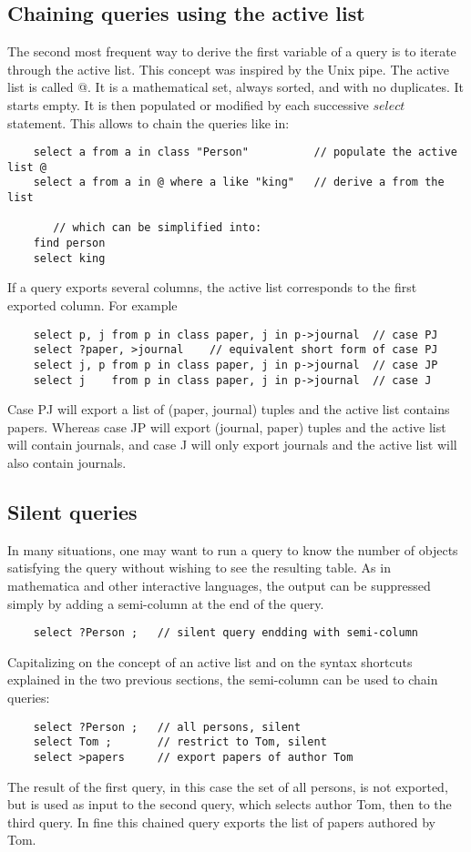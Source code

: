 \documentclass[11pt]{article}
\newcommand{\BL}{\begin{lstlisting}}
\begin{document}
\subsection{Chaining queries using the active list}
The second most frequent way to derive the first variable of a query is to iterate 
through the active list. This concept was inspired by the Unix pipe. 
The active list is called @. It is a mathematical set, always sorted,
and with no duplicates. It starts empty. It is then populated 
or modified by each successive $select$ statement. This allows to chain the queries like in:
\BL
    select a from a in class "Person"          // populate the active list @
    select a from a in @ where a like "king"   // derive a from the list

       // which can be simplified into:
    find person
    select king
\end{lstlisting}

If a query exports several columns, the active list corresponds to the first exported column. For example
\BL
    select p, j from p in class paper, j in p->journal  // case PJ
    select ?paper, >journal    // equivalent short form of case PJ
    select j, p from p in class paper, j in p->journal  // case JP
    select j    from p in class paper, j in p->journal  // case J
\end{lstlisting}
Case PJ will export a list of (paper, journal) tuples and the active list contains 
papers. Whereas case JP will export (journal, paper) tuples and the active list 
will contain journals, and case J will only export journals  and the active list will also contain journals.


\subsection{Silent queries}

In many situations, one may want to run a query to know the number 
of objects satisfying the query without wishing to
see the resulting table. As in mathematica and other interactive
languages, the output can be suppressed simply by adding 
a semi-column at the end of the query.
\BL
    select ?Person ;   // silent query endding with semi-column
\end{lstlisting}

Capitalizing on the concept of an active list
and on the syntax shortcuts explained in the two previous sections,
the semi-column can be used to chain queries:
\BL
    select ?Person ;   // all persons, silent
    select Tom ;       // restrict to Tom, silent
    select >papers     // export papers of author Tom
\end{lstlisting}
The result of the first query, in this case the set of all persons,
is not exported, but is used as input to the second query,
which selects author Tom, then to the third query. In fine
this chained query exports the list of papers authored by Tom.
\end{document}
